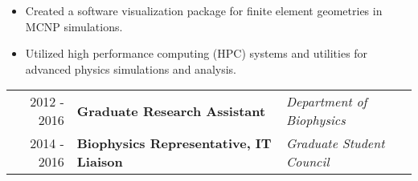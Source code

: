 \begin{minipage}{\textwidth}
\begin{center}
\begin{itemize}
	    		\item Created a software visualization package for finite element geometries in MCNP simulations.
	    		\item Utilized high performance computing (HPC) systems and utilities for advanced physics simulations and analysis.
		\end{itemize}
	\end{center}
\end{minipage}



\begin{minipage}{\textwidth}
	\begin{tabular}{r|ll}
		2012 - 2016 & \textbf{Graduate Research Assistant} & \textit{Department of Biophysics}  \\
		2014 - 2016 & \textbf{Biophysics Representative, IT Liaison} & \textit{Graduate Student Council}  \\
	\end{tabular}
\end{minipage}

